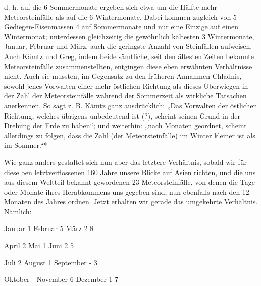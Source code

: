 \documentclass[a4paper, 8pt, oneside, polutonikogreek, german]{article}
\begin{document}
d. h. auf die 6 Sommermonate ergeben sich etwa um die Hälfte mehr Meteorsteinfälle als auf die 6 Wintermonate. Dabei kommen zugleich von 5 Gediegen-Eisenmassen 4 auf Sommermonate und nur eine Einzige auf einen Wintermonat; unterdessen gleichzeitig die gewöhnlich kältesten 3 Wintermonate, Januar, Februar und März, auch die geringste Anzahl von Steinfällen aufweisen. Auch Kämtz und Greg, indem beide sämtliche, seit den ältesten Zeiten bekannte Meteorsteinfälle zusammenstellten, entgingen diese eben erwähnten Verhältnisse nicht. Auch sie mussten, im Gegensatz zu den früheren Annahmen Chladnis, sowohl jenes Vorwalten einer mehr östlichen Richtung als dieses Überwiegen in der Zahl der Meteorsteinfälle während der Sommerzeit als wirkliche Tatsachen anerkennen. So sagt z. B. Kämtz ganz ausdrücklich: „Das Vorwalten der östlichen Richtung, welches übrigens unbedeutend ist (?), scheint seinen Grund in der Drehung der Erde zu haben“; und weiterhin: „nach Monaten geordnet, scheint allerdings zu folgen, dass die Zahl (der Meteorsteinfälle) im Winter kleiner ist als im Sommer.“*

Wie ganz anders gestaltet sich nun aber das letztere Verhältnis, sobald wir für dieselben letztverflossenen 160 Jahre unsere Blicke auf Asien richten, und die uns aus diesem Weltteil bekannt gewordenen 23 Meteorsteinfälle, von denen die Tage oder Monate ihres Herabkommens uns gegeben sind, nun ebenfalls nach den 12 Monaten des Jahres ordnen. Jetzt erhalten wir gerade das umgekehrte Verhältnis. Nämlich:

Januar 1  
Februar 5  
März 2  
8  

April 2  
Mai 1  
Juni 2  
5

Juli 2  
August 1  
September -  
3

Oktober -  
November 6  
Dezember 1  
7
\end{document}
